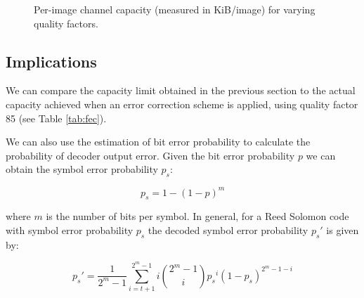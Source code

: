 \begin{figure}[tbph]
  \begin{center}
    \caption{Per-image channel capacity (measured in KiB/image) for varying quality factors.}
    \label{graph:capacity}
  \end{center}
\end{figure}

\subsection{Implications}

We can compare the capacity limit obtained in the previous section to the actual capacity achieved when an error correction scheme is applied, using quality factor 85 (see Table \ref{tab:fec}).

We can also use the estimation of bit error probability to calculate the probability of decoder output error. Given the bit error probability $p$ we can obtain the symbol error probability $p_s$:

\begin{equation}
    p_s = 1 - (1-p)^m
\end{equation}

where $m$ is the number of bits per symbol. In general, for a Reed Solomon code with symbol error probability $p_s$ the decoded symbol error probability $p_s'$ is given by:

\begin{equation}
    p_s' = \frac{1}{2^m -1} \sum^{2^m - 1}_{i = t+1} i {{2^m - 1}\choose{i}} {p_s}^i (1-{p_s})^{2^m - 1 - i}
\end{equation}


